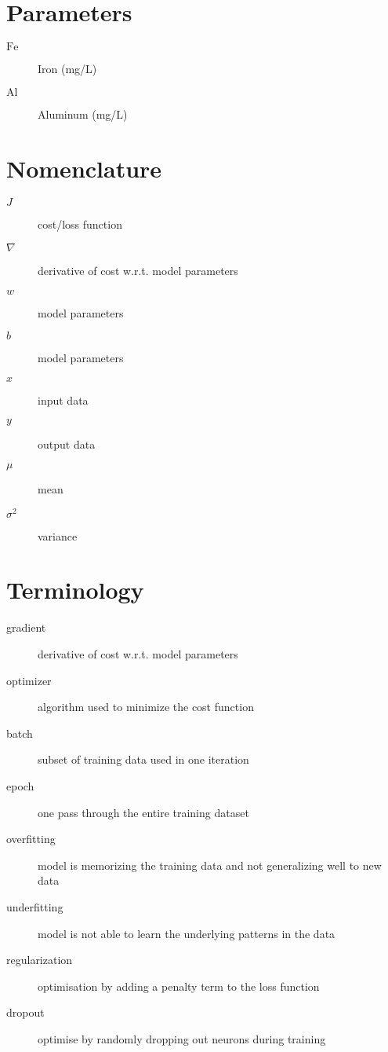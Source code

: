 \documentclass[
  a4paper,
  DIV=11,
  numbers=noendperiod,
  twoside]{scrreprt}
\begin{document}
\section*{Parameters}\label{parameters}


\begin{description}
\item[\(\text{Fe}\)]
Iron (mg/L)
\item[\(\text{Al}\)]
Aluminum (mg/L)
\end{description}

\section*{Nomenclature}\label{nomenclature}


\begin{description}
\item[\(J\)]
cost/loss function
\item[\(\nabla\)]
derivative of cost w.r.t. model parameters
\item[\(w\)]
model parameters
\item[\(b\)]
model parameters
\item[\(x\)]
input data
\item[\(y\)]
output data
\item[\(\mu\)]
mean
\item[\(\sigma^2\)]
variance
\end{description}

\section*{Terminology}\label{terminology}


\begin{description}
\item[gradient]
derivative of cost w.r.t. model parameters
\item[optimizer]
algorithm used to minimize the cost function
\item[batch]
subset of training data used in one iteration
\item[epoch]
one pass through the entire training dataset
\item[overfitting]
model is memorizing the training data and not generalizing well to new
data
\item[underfitting]
model is not able to learn the underlying patterns in the data
\item[regularization]
optimisation by adding a penalty term to the loss function
\item[dropout]
optimise by randomly dropping out neurons during training
\end{description}
\end{document}
